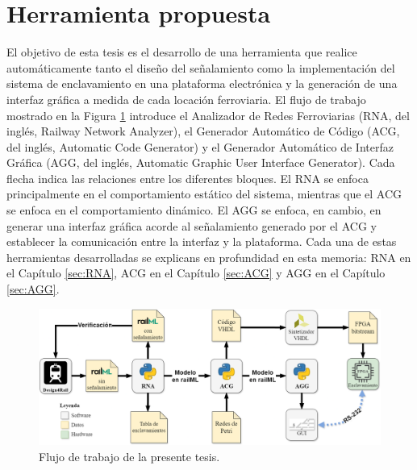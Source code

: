 \section{Herramienta propuesta}

    El objetivo de esta tesis es el desarrollo de una herramienta que realice automáticamente tanto el diseño del señalamiento como la implementación del sistema de enclavamiento en una plataforma electrónica y la generación de una interfaz gráfica a medida de cada locación ferroviaria. El flujo de trabajo mostrado en la Figura \ref{fig:workflow} introduce el Analizador de Redes Ferroviarias (RNA, del inglés, Railway Network Analyzer), el Generador Automático de Código (ACG, del inglés, Automatic Code Generator) y el Generador Automático de Interfaz Gráfica (AGG, del inglés, Automatic Graphic User Interface Generator). Cada flecha indica las relaciones entre los diferentes bloques. El RNA se enfoca principalmente en el comportamiento estático del sistema, mientras que el ACG se enfoca en el comportamiento dinámico. El AGG se enfoca, en cambio, en generar una interfaz gráfica acorde al señalamiento generado por el ACG y establecer la comunicación entre la interfaz y la plataforma. Cada una de estas herramientas desarrolladas se explicans en profundidad en esta memoria: RNA en el Capítulo \ref{sec:RNA}, ACG en el Capítulo \ref{sec:ACG} y AGG en el Capítulo \ref{sec:AGG}.

    \begin{figure}[H]
        \centering
        \includegraphics[width=1\textwidth]{Figuras/workflow.png}
        \centering\caption{Flujo de trabajo de la presente tesis.}
        \label{fig:workflow}
    \end{figure}

